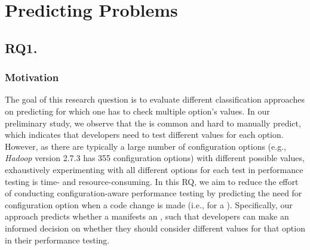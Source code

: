
\section{Predicting \inconsistent Problems} \label{sec:rq-results}

\subsection*{\textbf{RQ1. \RQII}}
\label{sec:rq2}





\subsubsection*{Motivation}

The goal of this research question is to evaluate different classification approaches on predicting for which \instance one has to check multiple option's values. %
In our preliminary study, we observe that the \inconsistent is common and hard to manually predict, %
which indicates that developers need to test different values for each option. However, as there are typically a large number of configuration options (e.g., \emph{Hadoop} version 2.7.3 has 355 configuration options) with different possible values, exhaustively experimenting with all different options for each test in performance testing is time- and resource-consuming. In this RQ, we aim to reduce the effort of conducting configuration-aware performance testing by predicting the need for  configuration option when a code change is made (i.e., for a \instance). Specifically, our approach predicts whether a \instance manifests an \inconsistent, such that developers can make an informed decision on whether they should consider different values for that option in their performance testing.

